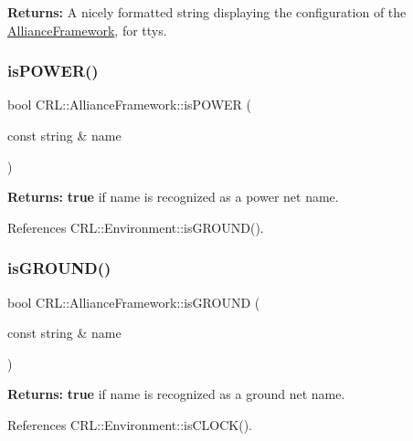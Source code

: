{\bfseries Returns\+:} A nicely formatted string displaying the configuration of the \hyperlink{classCRL_1_1AllianceFramework}{Alliance\+Framework}, for ttys. \mbox{\label{classCRL_1_1AllianceFramework_adc7dc5aa7e84b1fd94bc4a29bc6260e1}} 
\subsubsection{\texorpdfstring{is\+P\+O\+W\+E\+R()}{isPOWER()}}
{\footnotesize\ttfamily bool C\+R\+L\+::\+Alliance\+Framework\+::is\+P\+O\+W\+ER (\begin{DoxyParamCaption}\item[{const string \&}]{name }\end{DoxyParamCaption})\hspace{0.3cm}{\ttfamily [inline]}}

{\bfseries Returns\+:} {\bfseries true} if {\ttfamily name} is recognized as a power net name. 

References C\+R\+L\+::\+Environment\+::is\+G\+R\+O\+U\+N\+D().

\mbox{\label{classCRL_1_1AllianceFramework_a0dcd1a667226f37353fdf0ea232d9c5d}} 
\subsubsection{\texorpdfstring{is\+G\+R\+O\+U\+N\+D()}{isGROUND()}}
{\footnotesize\ttfamily bool C\+R\+L\+::\+Alliance\+Framework\+::is\+G\+R\+O\+U\+ND (\begin{DoxyParamCaption}\item[{const string \&}]{name }\end{DoxyParamCaption})\hspace{0.3cm}{\ttfamily [inline]}}

{\bfseries Returns\+:} {\bfseries true} if {\ttfamily name} is recognized as a ground net name. 

References C\+R\+L\+::\+Environment\+::is\+C\+L\+O\+C\+K().

